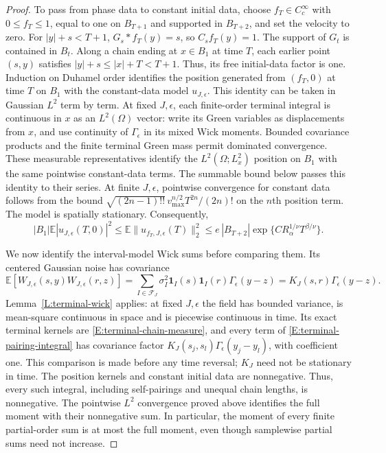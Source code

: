 \documentclass[12pt]{article}
\numberwithin{equation}{section}
\theoremstyle{definition}
\newcommand{\E}{\mathbb{E}}
\begin{document}
\begin{proof}
  To pass from phase data to constant initial data, choose
  $f_T\in C_c^\infty$ with $0\le f_T\le1$, equal to one on $B_{T+1}$
  and supported in $B_{T+2}$, and set the velocity to zero.
  For $|y|+s<T+1$, $G_s*f_T(y)=s$, so $C_sf_T(y)=1$.
  The support of $G_t$ is contained in $B_t$.
  Along a chain ending at $x\in B_1$ at time $T$, each earlier point
  $(s,y)$ satisfies $|y|+s\le|x|+T<T+1$.
  Thus, its free initial-data factor is one.
  Induction on Duhamel order identifies the position generated
  from $(f_T,0)$ at time $T$ on $B_1$ with the constant-data model
  $u_{J,\epsilon}$.
  This identity can be taken in Gaussian $L^2$ term by term.
  At fixed $J,\epsilon$, each finite-order terminal integral is
  continuous in $x$ as an $L^2(\Omega)$ vector: write its Green
  variables as displacements from $x$, and use continuity of
  $\Gamma_\epsilon$ in its mixed Wick moments. Bounded covariance
  products and the finite terminal Green mass permit dominated
  convergence. These measurable representatives identify the
  $L^2(\Omega;L^2_x)$ position on $B_1$ with the same pointwise
  constant-data terms. The summable bound below passes this identity
  to their series.
  At finite $J,\epsilon$, pointwise convergence for constant data follows
  from the bound
  $\sqrt{(2n-1)!!}\,v_{\max}^{n/2}T^{2n}/(2n)!$
  on the $n$th position term.
  The model is spatially stationary. Consequently,
  \[
    |B_1|\E|u_{J,\epsilon}(T,0)|^2
    \le\E\|u_{f_T,J,\epsilon}(T)\|_2^2
    \le e\,|B_{T+2}|\exp\{C R_\alpha^{1/\nu}T^{\beta/\nu}\}.
  \]

  We now identify the interval-model Wick sums before comparing them.
  Its centered Gaussian noise has covariance
  \[
    \E[W_{J,\epsilon}(s,y)W_{J,\epsilon}(r,z)]
    =\sum_{I\in\mathcal F_J}\sigma_I^2
    \mathbf1_I(s)\mathbf1_I(r)\Gamma_\epsilon(y-z)
    =K_J(s,r)\Gamma_\epsilon(y-z).
  \]
  Lemma~\ref{L:terminal-wick} applies: at fixed $J,\epsilon$ the field
  has bounded variance, is mean-square continuous in space and is
  piecewise continuous in time. Its exact terminal kernels are
  \eqref{E:terminal-chain-measure}, and every term of
  \eqref{E:terminal-pairing-integral} has covariance factor
  $K_J(s_j,s_l)\Gamma_\epsilon(y_j-y_l)$, with coefficient one.
  This comparison is made before any time reversal; $K_J$ need not be
  stationary in time. The position kernels and constant initial data
  are nonnegative. Thus, every such integral, including self-pairings
  and unequal chain lengths, is nonnegative. The pointwise $L^2$ convergence
  proved above identifies the full moment with their nonnegative sum.
  In particular, the moment of every finite partial-order sum is at most
  the full moment, even though samplewise partial sums need not increase.


\end{proof}
\end{document}
